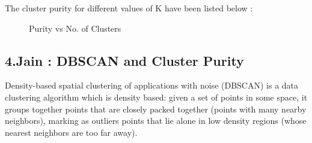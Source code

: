 \documentclass[paper=a4, fontsize=11pt]{scrartcl}
\numberwithin{equation}{section}		%
\numberwithin{figure}{section}			%
\numberwithin{table}{section}				%
\begin{document}
The cluster purity for different values of K have been listed below :

\begin{figure}[H]
  \centering
  \hfill
  \caption*{Purity vs No. of Clusters}
\end{figure}

\subsection*{4.Jain : DBSCAN and Cluster Purity}
Density-based spatial clustering of applications with noise (DBSCAN) is a data clustering algorithm which is density based: given a set of points in some space, it groups together points that are closely packed together (points with many nearby neighbors), marking as outliers points that lie alone in low density regions (whose nearest neighbors are too far away).
\end{document}
